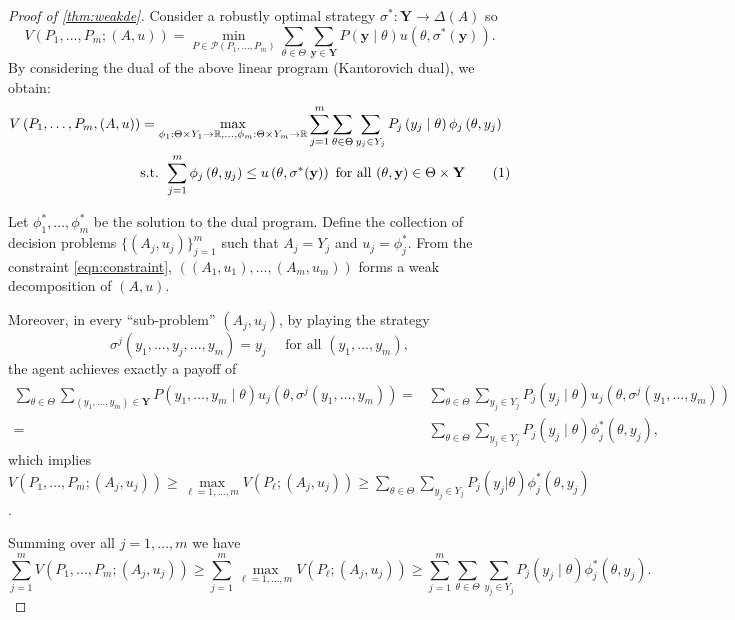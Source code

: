 \documentclass[11pt]{article}
\theoremstyle{plain}
\theoremstyle{remark}
\begin{document}
\begin{proof}[Proof of \autoref{thm:weakde}]
Consider a robustly optimal strategy $\sigma^*:\mathbf{Y}\rightarrow \Delta(A)$ so
\[V(P_1,...,P_m;(A,u))=\min _{P \in \mathcal{P}\left(P_{1}, \ldots, P_{m}\right)} \sum_{\theta \in \Theta} \sum_{\mathbf{y} \in \mathbf{Y}} P(\mathbf{y} \mid \theta) u\left(\theta,\sigma^{*}(\mathbf{y})\right).\]
By considering the dual of the above linear program (Kantorovich dual), we obtain:
\begin{align*}
    V\left(P_{1}, \ldots, P_{m},(A, u)\right) & =\max _{\phi_{1}: \Theta\times Y_{1} \rightarrow \mathbb{R}, \ldots, \phi_{m}: \Theta\times Y_{m} \rightarrow \mathbb{R}} \sum_{j=1}^{m} \sum_{\theta \in \Theta} \sum_{y_{j} \in Y_{j}} P_{j}\left(y_{j} \mid \theta\right) \phi_{j}\left( \theta,y_{j}\right)\\
    &\text{s.t. }\sum_{j=1}^{m} \phi_{j}\left(\theta,y_{j}\right) \leq u\left(\theta,\sigma^{*}(\mathbf{y})\right) \text { for all }(\theta, \mathbf{y}) \in \Theta \times \mathbf{Y}
    \addtocounter{equation}{1}\tag{\theequation} \label{eqn:constraint}
\end{align*}

Let $\phi_1^*,...,\phi_m^*$ be the solution to the dual program. Define the collection of decision problems $\{(A_j,u_j)\}_{j=1}^m$ such that $A_j=Y_j$ and $u_j=\phi_j^*$. From the constraint \eqref{eqn:constraint}, $((A_1,u_1),\ldots,(A_m,u_m))$ forms a weak decomposition of $(A,u)$. 

Moreover, in every ``sub-problem'' $(A_j,u_j)$, by playing the strategy 
\[\sigma^j(y_1,...,y_j,...,y_m)=y_j\quad \text{ for all } (y_1,...,y_m),\] 
the agent achieves exactly a payoff of
\begin{align*}
    \sum_{\theta \in \Theta} \sum_{\left(y_{1}, \ldots, y_{m}\right) \in \mathbf{Y}} P(y_{1}, \ldots, y_{m} \mid \theta) u_j(\theta, \sigma^j(y_{1}, \ldots, y_{m}))
    =&\sum_{\theta \in \Theta} \sum_{y_j \in Y_j} P_j(y_j \mid \theta) u_j(\theta, \sigma^j(y_{1}, \ldots, y_{m}))\\
    =&\sum_{\theta \in \Theta} \sum_{y_j \in Y_j} P_j(y_j \mid \theta) \phi_j^*(\theta, y_j),
\end{align*}
which implies $V(P_1,...,P_m;(A_j,u_j))\geq \max\limits_{\ell=1,...,m} V(P_\ell;(A_j,u_j))\geq \sum_{\theta \in \Theta} \sum_{y_j \in Y_j} P_j(y_j|\theta) \phi_j^*(\theta, y_j)$. 

Summing over all $j=1,...,m$ we have 
\begin{equation}\label{eq:weakde}
    \sum_{j=1}^m V(P_1,...,P_m;(A_j,u_j))\geq \sum_{j=1}^m\max_{\ell=1,...,m} V(P_\ell;(A_j,u_j)) \geq \sum_{j=1}^m \sum_{\theta \in \Theta} \sum_{y_j \in Y_j} P_j(y_j \mid \theta) \phi_j^*(\theta, y_j).
\end{equation}


\end{proof}
\end{document}
